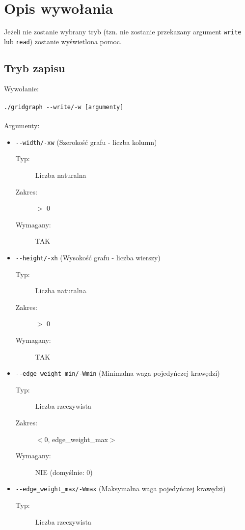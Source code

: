\documentclass[11pt,a4paper]{report}
\begin{document}
    \newpage
    \section{Opis wywołania}
    Jeżeli nie zostanie wybrany tryb (tzn. nie zostanie przekazany argument \verb|write| lub \verb|read|) zostanie wyświetlona pomoc.\\
    \subsection{Tryb zapisu}
    Wywołanie:\\
    \\
    \verb|./gridgraph --write/-w [argumenty]|\\
    \\
    Argumenty:
    \begin{itemize}
        \item \verb|--width/-xw| (Szerokość grafu - liczba kolumn)
        \begin{description}
            \item[Typ:] Liczba naturalna
            \item[Zakres:] $>$ 0 
            \item[Wymagany:] TAK
        \end{description}
        \item \verb|--height/-xh| (Wysokość grafu - liczba wierszy)
        \begin{description}
            \item[Typ:] Liczba naturalna
            \item[Zakres:] $>$ 0 
            \item[Wymagany:] TAK
        \end{description}
        \item \verb|--edge_weight_min/-Wmin| (Minimalna waga pojedyńczej krawędzi)
        \begin{description}
            \item[Typ:] Liczba rzeczywista
            \item[Zakres:] $<$0, edge\_weight\_max$>$
            \item[Wymagany:] NIE (domyślnie: 0)
        \end{description}
        \item \verb|--edge_weight_max/-Wmax| (Maksymalna waga pojedyńczej krawędzi)
        \begin{description}
            \item[Typ:] Liczba rzeczywista

\end{description}
\end{itemize}
\end{document}
